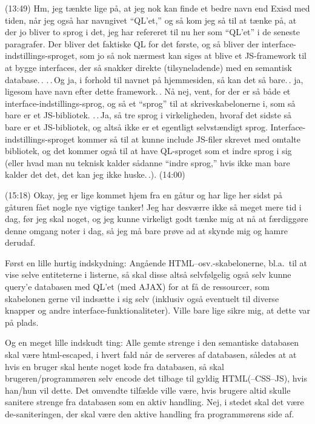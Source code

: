 \documentclass{report}
\begin{document}
(13:49) Hm, jeg tænkte lige på, at jeg nok kan finde et bedre navn end Exisd med tiden, når jeg også har navngivet ``QL'et,'' og så kom jeg så til at tænke på, at der jo bliver to sprog i det, jeg har refereret til nu her som ``QL'et'' i de seneste paragrafer. Der bliver det faktiske QL for det første, og så bliver der interface-indstillings-sproget, som jo så nok nærmest kan siges at blive et JS-framework til at bygge interfaces, der så snakker direkte (tilsyneladende) med en semantisk database.\,. .\,.\,Og ja, i forhold til navnet på hjemmesiden, så kan det så bare.\,. ja, ligesom have navn efter dette framework.\,. Nå nej, vent, for der er så både et interface-indstillings-sprog, og så et ``sprog'' til at skriveskabelonerne i, som så bare er et JS-bibliotek. .\,.\,Ja, så tre sprog i virkeligheden, hvoraf det sidste så bare er et JS-bibliotek, og altså ikke er et egentligt selvstændigt sprog. Interface-indstillings-sproget kommer så til at kunne include JS-filer skrevet med omtalte bibliotek, og det kommer også til at have QL-sproget som et indre sprog i sig (eller hvad man nu teknisk kalder sådanne ``indre sprog,'' hvis ikke man bare kalder det det, det kan jeg ikke huske.\,.). (14:00)


(15:18) Okay, jeg er lige kommet hjem fra en gåtur og har lige her sidst på gåturen fået nogle nye vigtige tanker! Jeg har desværre ikke så meget mere tid i dag, før jeg skal noget, og jeg kunne virkeligt godt tænke mig at nå at færdiggøre denne omgang noter i dag, så jeg må bare prøve ad at skynde mig og hamre derudaf.

Først en lille hurtig indskydning: Angående HTML--osv.-skabelonerne, bl.a.\ til at vise selve entiteterne i listerne, så skal disse altså selvfølgelig også selv kunne query'e databasen med QL'et (med AJAX) for at få de ressourcer, som skabelonen gerne vil indsætte i sig selv (inklusiv også eventuelt til diverse knapper og andre interface-funktionaliteter). Ville bare lige sikre mig, at dette var på plads.

Og en meget lille indskudt ting: Alle gemte strenge i den semantiske databasen skal være html-escaped, i hvert fald når de serveres af databasen, således at at hvis en bruger skal hente noget kode fra databasen, så skal brugeren/programmøren selv encode det tilbage til gyldig HTML(--CSS--JS), hvis han/hun vil dette. Det omvendte tilfælde ville være, hvis brugere altid skulle sanitere strenge fra databasen som en aktiv handling. Nej, i stedet skal det være de-saniteringen, der skal være den aktive handling fra programmørens side af. 
\end{document}
